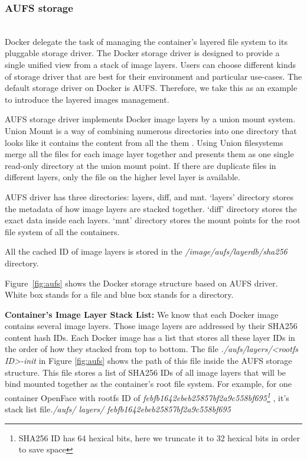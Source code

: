 

\subsubsection{AUFS storage}~\\
Docker delegate the task of managing the container's layered file system to its pluggable storage driver. 
The Docker storage driver is designed to provide a single unified view from a stack of image layers.
Users can choose different kinds of storage driver that are best for their environment and particular use-cases. The default storage driver on Docker is AUFS. Therefore, we take this as an example to introduce the layered images management.

AUFS storage driver implements Docker image layers by a union mount system. Union Mount is a way of combining numerous directories into one directory that looks like it contains the content from all the them \cite{unionMount}. Using Union filesystems merge all the files for each image layer together and presents them as one single read-only directory at the union mount point. If there are duplicate files in different layers, only the file on the higher level layer is available.

AUFS driver has three directories: layers, diff, and mnt. `layers' directory stores the metadata of how image layers are stacked together. `diff' directory stores the exact data inside each layers. `mnt' directory stores the mount points for the root file system of all the containers. 

All the cached ID of image layers is stored in the \textit{/image/aufs/layerdb/sha256} directory.



Figure~\ref{fig:aufs} shows the Docker storage structure based on AUFS driver. White box stands for a file and blue box stands for a directory. 


\textbf{Container's Image Layer Stack List:} We know that each Docker image contains several image layers. Those image layers are addressed by their SHA256 content hash IDs. Each Docker image has a list that stores all these layer IDs in the order of how they stacked from top to bottom.
The file \textit{./aufs/layers/<rootfs ID>-init}  in Figure \ref{fig:aufs} shows the path of this file inside the AUFS storage structure. This file stores a list of SHA256 IDs of all image layers that will be bind mounted together as the container's root file system. For example, for one container OpenFace with rootfs ID of \textit{
febfb1642ebeb25857bf2a9c558bf695\footnote{SHA256 ID has 64 hexical bits, here we truncate it to 32 hexical bits in order to save space}
}, it's stack list file\textit{./aufs/ layers/ febfb1642ebeb25857bf2a9c558bf695}


